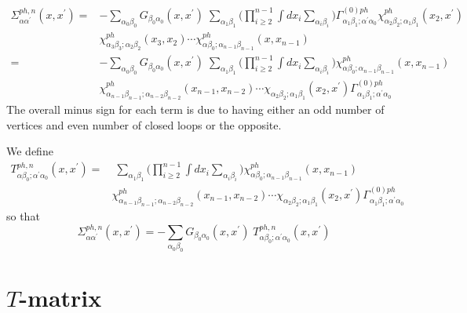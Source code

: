 \begin{equation}
\begin{split}
\Sigma^{ph,n}_{\alpha\alpha^{\prime}}(x,x^{\prime}) = &
-\sum_{\alpha_0\beta_0} G_{\beta_0 \alpha_0}(x,x^{\prime}) \;
 \sum_{\alpha_1 \beta_1} \big( \prod_{i \geq 2}^{n-1} \int dx_i \sum_{\alpha_i \beta_i} \big)
\Gamma^{(0)ph}_{\alpha_1 \beta_1; \alpha^{\prime}\alpha_0}
\chi^{ph}_{\alpha_2 \beta_2; \alpha_1 \beta_1}(x_2, x^{\prime})
\\
& \chi^{ph}_{\alpha_3 \beta_3; \alpha_2 \beta_2}(x_3, x_2)
\cdots
\chi^{ph}_{\alpha \beta_0; \alpha_{n-1} \beta_{n-1}}(x,x_{n-1}) \\
= & - \sum_{\alpha_0\beta_0} G_{\beta_0 \alpha_0}(x,x^{\prime}) \;
 \sum_{\alpha_1 \beta_1}
 \big( \prod_{i \ge 2}^{n-1} \int dx_i \sum_{\alpha_i \beta_i} \big) 
 \chi^{ph}_{\alpha \beta_0; \alpha_{n-1} \beta_{n-1}}(x,x_{n-1})
\\
& \chi^{ph}_{\alpha_{n-1} \beta_{n-1}; \alpha_{n-2} \beta_{n-2}}(x_{n-1},x_{n-2})
\cdots \chi_{\alpha_2\beta_2; \alpha_1 \beta_1}(x_2, x^{\prime})
\Gamma^{(0)ph}_{\alpha_1 \beta_1; \alpha^{\prime}\alpha_0}
\end{split}
\end{equation}
The overall minus sign for each term is due to having either
an odd number of vertices and even number of closed loops or
the opposite.

We define 
\begin{equation}
\begin{split}
T^{ph,n}_{\alpha\beta_0; \alpha^{\prime}\alpha_0}(x,x^{\prime}) =
& \;
 \sum_{\alpha_1 \beta_1} \big( \prod_{i \ge 2}^{n-1} 
\int dx_i \sum_{\alpha_i \beta_i} \big) 
\chi^{ph}_{\alpha \beta_0; \alpha_{n-1} \beta_{n-1}}(x,x_{n-1})
\\ &
\chi^{ph}_{\alpha_{n-1} \beta_{n-1}; \alpha_{n-2} \beta_{n-2}}(x_{n-1},x_{n-2})
\cdots \chi_{\alpha_2\beta_2; \alpha_1 \beta_1}(x_2, x^{\prime})
\Gamma^{(0)ph}_{\alpha_1 \beta_1; \alpha^{\prime}\alpha_0}
\end{split}
\end{equation}
so that
\begin{equation}
\Sigma^{ph,n}_{\alpha\alpha^{\prime}}(x,x^{\prime}) =
-\sum_{\alpha_0 \beta_0}
G_{\beta_0 \alpha_0}(x,x^{\prime})\; 
T^{ph,n}_{\alpha \beta_0; \alpha^{\prime} \alpha_0}(x,x^{\prime})
\end{equation}

\section{$T$-matrix}

